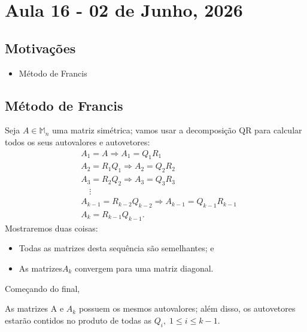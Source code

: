 \documentclass[../numerical_methods.tex]{subfiles}
\begin{document}
\section{Aula 16 - 02 de Junho, 2026}
\subsection{Motivações}
\begin{itemize}
	\item Método de Francis
\end{itemize}
\subsection{Método de Francis}
Seja \(A\in \mathbb{M}_{n}\) uma matriz simétrica; vamos usar a decomposição QR para calcular todos os seus autovalores e autovetores:
\begin{align*}
	 & A_1 = A \Rightarrow A_1 = Q_1 R_1                             \\
	 & A_2 = R_1Q_1 \Rightarrow A_2 = Q_2R_2                         \\
	 & A_3 = R_2Q_2 \Rightarrow A_3 = Q_3R_3                         \\
	 & \quad \vdots                                                  \\
	 & A_{k-1} = R_{k-2}Q_{k-2} \Rightarrow A_{k-1} = Q_{k-1}R_{k-1} \\
	 & A_{k} = R_{k-1}Q_{k-1}.
\end{align*}
Mostraremos duas coisas:
\begin{itemize}
	\item[i)] Todas as matrizes desta sequência são semelhantes; e
	\item[ii)] As matrizes\(A_{k}\) convergem para uma matriz diagonal.
\end{itemize}
Começando do final,
\begin{prop*}
	As matrizes A e \(A_{k}\) possuem os mesmos autovalores; além disso, os autovetores estarão contidos no produto de todas as \(Q_{i},\; 1\leq i\leq k-1\).
\end{prop*}
\end{document}
